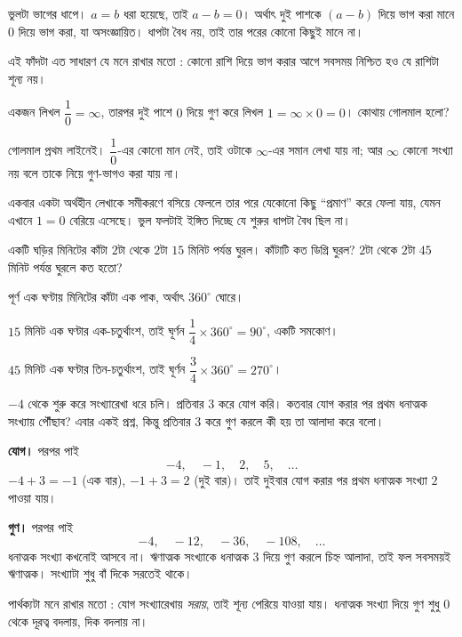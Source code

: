 \documentclass[11pt]{article}
\begin{document}
\begin{sol}
ভুলটা ভাগের ধাপে। $a = b$ ধরা হয়েছে, তাই $a - b = 0$। অর্থাৎ দুই পাশকে
$(a-b)$ দিয়ে ভাগ করা মানে $0$ দিয়ে ভাগ করা, যা অসংজ্ঞায়িত। ধাপটা বৈধ নয়,
তাই তার পরের কোনো কিছুই মানে না।

এই ফাঁদটা এত সাধারণ যে মনে রাখার মতো : কোনো রাশি দিয়ে ভাগ করার আগে সবসময়
নিশ্চিত হও যে রাশিটা শূন্য নয়।
\end{sol}

 একজন লিখল $\dfrac{1}{0} = \infty$, তারপর দুই পাশে $0$ দিয়ে গুণ করে
লিখল $1 = \infty \times 0 = 0$। কোথায় গোলমাল হলো?

\begin{sol}
গোলমাল প্রথম লাইনেই। $\dfrac{1}{0}$-এর কোনো মান নেই, তাই ওটাকে $\infty$-এর
সমান লেখা যায় না; আর $\infty$ কোনো সংখ্যা নয় বলে তাকে নিয়ে গুণ-ভাগও করা যায় না।

একবার একটা অর্থহীন লেখাকে সমীকরণে বসিয়ে ফেললে তার পরে যেকোনো কিছু ``প্রমাণ''
করে ফেলা যায়, যেমন এখানে $1 = 0$ বেরিয়ে এসেছে। ভুল ফলটাই ইঙ্গিত দিচ্ছে যে
শুরুর ধাপটা বৈধ ছিল না।
\end{sol}

 একটি ঘড়ির মিনিটের কাঁটা $2$টা থেকে $2$টা $15$ মিনিট পর্যন্ত ঘুরল।
কাঁটাটি কত ডিগ্রি ঘুরল? $2$টা থেকে $2$টা $45$ মিনিট পর্যন্ত ঘুরলে কত হতো?

\begin{sol}
পূর্ণ এক ঘণ্টায় মিনিটের কাঁটা এক পাক, অর্থাৎ $360^\circ$ ঘোরে।

$15$ মিনিট এক ঘণ্টার এক-চতুর্থাংশ, তাই ঘূর্ণন
$\dfrac{1}{4} \times 360^\circ = 90^\circ$, একটি সমকোণ।

$45$ মিনিট এক ঘণ্টার তিন-চতুর্থাংশ, তাই ঘূর্ণন
$\dfrac{3}{4} \times 360^\circ = 270^\circ$।
\end{sol}

 $-4$ থেকে শুরু করে সংখ্যারেখা ধরে চলি। প্রতিবার $3$ করে যোগ করি।
কতবার যোগ করার পর প্রথম ধনাত্মক সংখ্যায় পৌঁছাব? এবার একই প্রশ্ন, কিন্তু
প্রতিবার $3$ করে গুণ করলে কী হয় তা আলাদা করে বলো।

\begin{sol}
\textbf{যোগ।} পরপর পাই
\[
  -4, \quad -1, \quad 2, \quad 5, \quad \dots
\]
$-4 + 3 = -1$ (এক বার), $-1 + 3 = 2$ (দুই বার)। তাই দুইবার যোগ করার পর প্রথম
ধনাত্মক সংখ্যা $2$ পাওয়া যায়।

\medskip
\textbf{গুণ।} পরপর পাই
\[
  -4, \quad -12, \quad -36, \quad -108, \quad \dots
\]
ধনাত্মক সংখ্যা কখনোই আসবে না। ঋণাত্মক সংখ্যাকে ধনাত্মক $3$ দিয়ে গুণ করলে
চিহ্ন আলাদা, তাই ফল সবসময়ই ঋণাত্মক। সংখ্যাটা শুধু বাঁ দিকে সরতেই থাকে।

\medskip
পার্থক্যটা মনে রাখার মতো : যোগ সংখ্যারেখায় \emph{সরায়}, তাই শূন্য পেরিয়ে
যাওয়া যায়। ধনাত্মক সংখ্যা দিয়ে গুণ শুধু $0$ থেকে দূরত্ব বদলায়, দিক বদলায় না।
\end{sol}
\end{document}
